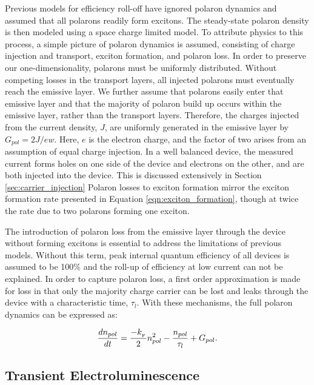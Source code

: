 \documentclass[../thesis.tex]{subfiles}
\begin{document}
Previous models for efficiency roll-off have ignored polaron dynamics and assumed that all polarons readily form excitons.  The steady-state polaron density is then modeled using a space charge limited model.\supercite{Pope1999}
To attribute physics to this process, a simple picture of polaron dynamics is assumed, consisting of charge injection and transport, exciton formation, and polaron loss.  
In order to preserve our one-dimensionality, polarons must be uniformly distributed.  
Without competing losses in the transport layers, all injected polarons must eventually reach the emissive layer.  
We further assume that polarons easily enter that emissive layer and that the majority of polaron build up occurs within the emissive layer, rather than the transport layers.
Therefore, the charges injected from the current density, $J$, are uniformly generated in the emissive layer by $G_{pol}=2J/ew$.  Here, $e$ is the electron charge, and the factor of two arises from an assumption of equal charge injection.  In a well balanced device, the measured current forms holes on one side of the device and electrons on the other, and are both injected into the device.  
This is discussed extensively in Section \ref{sec:carrier_injection}
Polaron losses to exciton formation mirror the exciton formation rate presented in Equation \ref{eqn:exciton_formation}, though at twice the rate due to two polarons forming one exciton.

The introduction of polaron loss from the emissive layer through the device without forming excitons is essential to address the limitations of previous models.  
Without this term, peak internal quantum efficiency of all devices is assumed to be 100\% and the roll-up of efficiency at low current can not be explained.  
In order to capture polaron loss, a first order approximation is made for loss in that only the majority charge carrier can be lost and leaks through the device with a characteristic time, $\tau_l$.
With these mechanisms, the full polaron dynamics can be expressed as:




\begin{equation}
\frac{dn_{pol}}{dt}=\frac{-k_{_\text{\tiny F}}}{2}n_{pol}^2-\frac{n_{pol}}{\tau_l}+G_{pol}.
\label{eqn:polaron_rate}
\end{equation}

\subsection{Transient Electroluminescence} \label{sec:transient_el}
\end{document}
